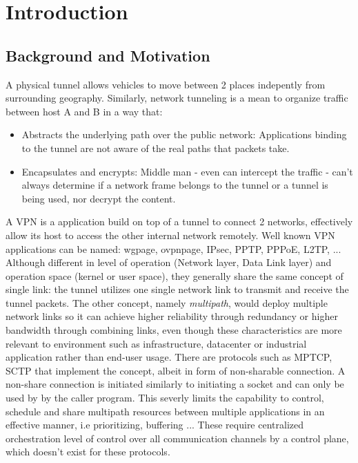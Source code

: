 \cleardoublepage\chapter{Introduction}
\minitoc\label{sec:introduction}\vspace{.5cm}

\section{Background and Motivation}
A physical tunnel allows vehicles to move between 2 places indepently from surrounding geography. 
Similarly, network tunneling is a mean to organize traffic between host A and B in a way that:

\begin{itemize}
    \item Abstracts the underlying path over the public network: Applications binding to the tunnel are not aware of the real paths that packets take.
    \item Encapsulates and encrypts: Middle man - even can intercept the traffic - can't always determine if a network frame belongs to the tunnel or a tunnel is being used, nor decrypt the content.
\end{itemize}

A \ac{VPN} is a application build on top of a tunnel to connect 2 networks, effectively allow its host to access the other internal network remotely.
Well known \ac{VPN} applications can be named: \ac{wgpage}, \ac{ovpnpage}, IPsec, PPTP, PPPoE, L2TP, ...
Although different in level of operation (Network layer, Data Link layer) and operation space (kernel or user space), they generally share the same concept of single link: the tunnel utilizes one single network link to transmit and receive the tunnel packets. 
The other concept, namely \textit{multipath}, would deploy multiple network links so it can achieve higher reliability through redundancy or higher bandwidth through combining links, even though these characteristics are more relevant to environment such as infrastructure, datacenter or industrial application rather than end-user usage.
There are protocols such as \ac{MPTCP}, \ac{SCTP} that implement the concept, albeit in form of non-sharable connection.
A non-share connection is initiated similarly to initiating a socket and can only be used by by the caller program. 
This severly limits the capability to control, schedule and share multipath resources between multiple applications in an effective manner, i.e prioritizing, buffering ... 
These require centralized orchestration level of control over all communication channels by a control plane, which doesn't exist for these protocols.

